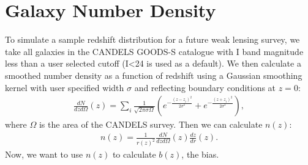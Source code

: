 \documentclass[a4paper,11pt]{article}
\begin{document}
\section{Galaxy Number Density}
\label{sec:nz_candels}
To simulate a sample redshift distribution for a future weak lensing survey, we take all galaxies in the CANDELS\cite{candels_1}\cite{candels_2} GOODS-S catalogue with I band magnitude less than a user selected cutoff (I<24 is used as a default). We then calculate a smoothed number density as a function of redshift using a Gaussian smoothing kernel with user specified width $\sigma$ and reflecting boundary conditions at $z=0$:
\begin{align}\label{candels_dndzofz}
\frac{dN}{dz d\Omega}(z)=\sum_{i}{\frac{1}{\sqrt{2\pi\sigma\Omega}}\left(e^{-\frac{(z-z_i)^2}{2\sigma^2}}+e^{-\frac{(z+z_i)^2}{2\sigma^2}}\right)},
\end{align}
where $\Omega$ is the area of the CANDELS survey. Then we can calculate $n(z)$:
\begin{align}\label{candels_nofz}
n(z) = \frac{1}{r(z)^2}\frac{dN}{dz d\Omega}(z)\frac{dz}{dr}(z).
\end{align}
Now, we want to use $n(z)$ to calculate $b(z)$, the bias. \cite{jenkins_hmf}\cite{sheth_tormen_hmf}
\end{document}
